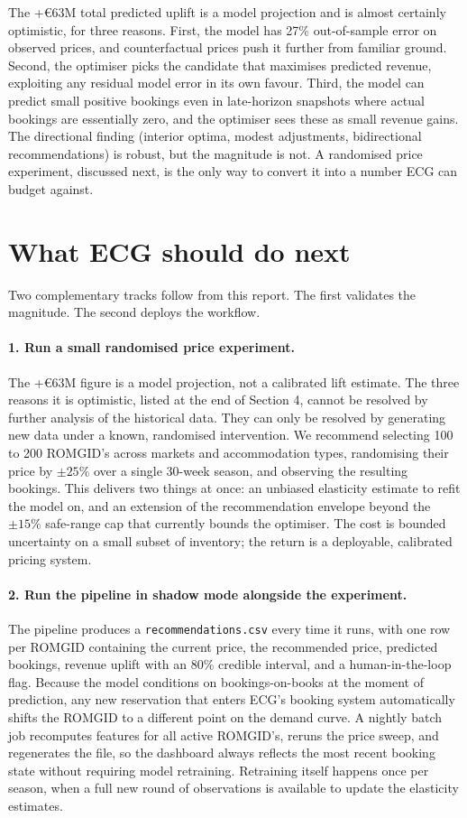 \documentclass[11pt,a4paper]{article}
\begin{document}
The +\euro{}63M total predicted uplift is a model projection and is almost certainly optimistic, for three reasons. First, the model has 27\% out-of-sample error on observed prices, and counterfactual prices push it further from familiar ground. Second, the optimiser picks the candidate that maximises predicted revenue, exploiting any residual model error in its own favour. Third, the model can predict small positive bookings even in late-horizon snapshots where actual bookings are essentially zero, and the optimiser sees these as small revenue gains. The directional finding (interior optima, modest adjustments, bidirectional recommendations) is robust, but the magnitude is not. A randomised price experiment, discussed next, is the only way to convert it into a number ECG can budget against.

\section{What ECG should do next}

Two complementary tracks follow from this report. The first validates the magnitude. The second deploys the workflow.

\paragraph{1. Run a small randomised price experiment.} The +\euro{}63M figure is a model projection, not a calibrated lift estimate. The three reasons it is optimistic, listed at the end of Section 4, cannot be resolved by further analysis of the historical data. They can only be resolved by generating new data under a known, randomised intervention. We recommend selecting 100 to 200 ROMGID's across markets and accommodation types, randomising their price by $\pm 25\%$ over a single 30-week season, and observing the resulting bookings. This delivers two things at once: an unbiased elasticity estimate to refit the model on, and an extension of the recommendation envelope beyond the $\pm 15\%$ safe-range cap that currently bounds the optimiser. The cost is bounded uncertainty on a small subset of inventory; the return is a deployable, calibrated pricing system.

\paragraph{2. Run the pipeline in shadow mode alongside the experiment.} The pipeline produces a \texttt{recommendations.csv} every time it runs, with one row per ROMGID containing the current price, the recommended price, predicted bookings, revenue uplift with an 80\% credible interval, and a human-in-the-loop flag. Because the model conditions on bookings-on-books at the moment of prediction, any new reservation that enters ECG's booking system automatically shifts the ROMGID to a different point on the demand curve. A nightly batch job recomputes features for all active ROMGID's, reruns the price sweep, and regenerates the file, so the dashboard always reflects the most recent booking state without requiring model retraining. Retraining itself happens once per season, when a full new round of observations is available to update the elasticity estimates.
\end{document}
